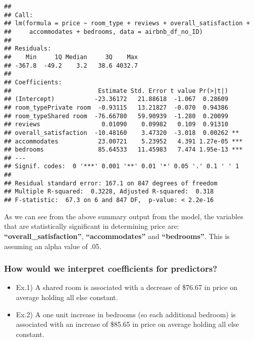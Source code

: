 \documentclass[]{article}
\providecommand{\tightlist}{%
  \setlength{\itemsep}{0pt}\setlength{\parskip}{0pt}}
\begin{document}
\begin{verbatim}
## 
## Call:
## lm(formula = price ~ room_type + reviews + overall_satisfaction + 
##     accommodates + bedrooms, data = airbnb_df_no_ID)
## 
## Residuals:
##    Min     1Q Median     3Q    Max 
## -367.8  -49.2    3.2   38.6 4032.7 
## 
## Coefficients:
##                        Estimate Std. Error t value Pr(>|t|)    
## (Intercept)           -23.36172   21.88618  -1.067  0.28609    
## room_typePrivate room  -0.93115   13.21827  -0.070  0.94386    
## room_typeShared room  -76.66780   59.90939  -1.280  0.20099    
## reviews                 0.01090    0.09982   0.109  0.91310    
## overall_satisfaction  -10.48160    3.47320  -3.018  0.00262 ** 
## accommodates           23.00721    5.23952   4.391 1.27e-05 ***
## bedrooms               85.64533   11.45983   7.474 1.95e-13 ***
## ---
## Signif. codes:  0 '***' 0.001 '**' 0.01 '*' 0.05 '.' 0.1 ' ' 1
## 
## Residual standard error: 167.1 on 847 degrees of freedom
## Multiple R-squared:  0.3228, Adjusted R-squared:  0.318 
## F-statistic:  67.3 on 6 and 847 DF,  p-value: < 2.2e-16
\end{verbatim}

As we can see from the above summary output from the model, the
variables that are statistically significant in determining price are:
\textbf{``overall\_satisfaction''}, \textbf{``accommodates''} and
\textbf{``bedrooms''}. This is assuming an alpha value of .05.

\hypertarget{how-would-we-interpret-coefficients-for-predictors}{%
\subsubsection{How would we interpret coefficients for
predictors?}\label{how-would-we-interpret-coefficients-for-predictors}}

\begin{itemize}
\tightlist
\item
  Ex.1) A shared room is associated with a decrease of \$76.67 in price
  on average holding all else constant.
\item
  Ex.2) A one unit increase in bedrooms (so each additional bedroom) is
  associated with an increase of \$85.65 in price on average holding all
  else constant.
\end{itemize}
\end{document}
